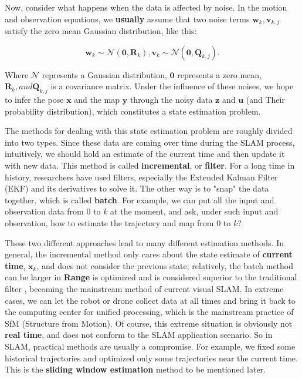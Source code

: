 Now, consider what happens when the data is affected by noise. In the motion and observation equations, we \textbf{usually} assume that two noise terms $\bm{w}_k, \bm{v}_{k,j}$ satisfy the zero mean Gaussian distribution, like this:

\begin{equation}
{\bm{w}_k} \sim \mathcal{N}\left( {\bm{0},{\bm{R}_k}} \right),{\bm{v}_k} \sim \mathcal {N}\left( {\bm{0},{{{\bm{Q}}}_{k,j}}} \right).
\end{equation}

Where $\mathcal{N}$ represents a Gaussian distribution, $\bm{0}$ represents a zero mean, $\bm{R}_k, and \bm{Q}_{k,j}$ is a covariance matrix. Under the influence of these noises, we hope to infer the pose $\bm{x}$ and the map $\bm{y}$ through the noisy data $\bm{z}$ and $\bm{u}$ (and Their probability distribution), which constitutes a state estimation problem.

The methods for dealing with this state estimation problem are roughly divided into two types. Since these data are coming over time during the SLAM process, intuitively, we should hold an estimate of the current time and then update it with new data. This method is called \textbf{incremental}, or \textbf{filter}. For a long time in history, researchers have used filters, especially the Extended Kalman Filter (EKF) and its derivatives to solve it. The other way is to "snap" the data together, which is called \textbf{batch}. For example, we can put all the input and observation data from 0 to $k$ at the moment, and ask, under such input and observation, how to estimate the trajectory and map from 0 to $k$?

These two different approaches lead to many different estimation methods. In general, the incremental method only cares about the state estimate of \textbf{current time}, $\bm{x}_k$, and does not consider the previous state; relatively, the batch method can be larger in \textbf{ Range} is optimized and is considered superior to the traditional filter \textsuperscript{\cite{Strasdat2012}}, becoming the mainstream method of current visual SLAM. In extreme cases, we can let the robot or drone collect data at all times and bring it back to the computing center for unified processing, which is the mainstream practice of SfM (Structure from Motion). Of course, this extreme situation is obviously not \textbf{real time}, and does not conform to the SLAM application scenario. So in SLAM, practical methods are usually a compromise. For example, we fixed some historical trajectories and optimized only some trajectories near the current time. This is the \textbf{sliding window estimation} method to be mentioned later.

